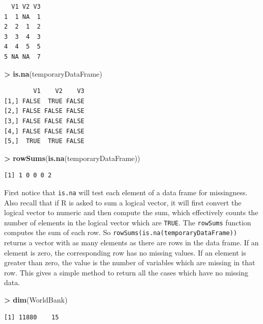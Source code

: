 \documentclass[]{krantz}
\makeatletter
\newenvironment{Shaded}{\begin{snugshade}}{\end{snugshade}}
\newcommand{\KeywordTok}[1]{\textcolor[rgb]{0.27,0.27,0.27}{\textbf{#1}}}
\newcommand{\NormalTok}[1]{#1}
\newcommand{\OperatorTok}[1]{\textcolor[rgb]{0.43,0.43,0.43}{\textbf{#1}}}
\newcommand{\StringTok}[1]{\textcolor[rgb]{0.5,0.5,0.5}{#1}}
\newenvironment{kframe}{%
\medskip{}
\setlength{\fboxsep}{.8em}
 \def\at@end@of@kframe{}%
 \ifinner\ifhmode%
  \def\at@end@of@kframe{\end{minipage}}%
  \begin{minipage}{\columnwidth}%
 \fi\fi%
 \def\FrameCommand##1{\hskip\@totalleftmargin \hskip-\fboxsep
 \colorbox{shadecolor}{##1}\hskip-\fboxsep
     \hskip-\linewidth \hskip-\@totalleftmargin \hskip\columnwidth}%
 \MakeFramed {\advance\hsize-\width
   \@totalleftmargin\z@ \linewidth\hsize
   \@setminipage}}%
 {\par\unskip\endMakeFramed%
 \at@end@of@kframe}
\renewenvironment{Shaded}{\begin{kframe}}{\end{kframe}}
\makeatother
\begin{document}
\begin{verbatim}
  V1 V2 V3
1  1 NA  1
2  2  1  2
3  3  4  3
4  4  5  5
5 NA NA  7
\end{verbatim}

\begin{Shaded}
\begin{Highlighting}[]
\OperatorTok{>}\StringTok{ }\KeywordTok{is.na}\NormalTok{(temporaryDataFrame)}
\end{Highlighting}
\end{Shaded}

\begin{verbatim}
        V1    V2    V3
[1,] FALSE  TRUE FALSE
[2,] FALSE FALSE FALSE
[3,] FALSE FALSE FALSE
[4,] FALSE FALSE FALSE
[5,]  TRUE  TRUE FALSE
\end{verbatim}

\begin{Shaded}
\begin{Highlighting}[]
\OperatorTok{>}\StringTok{ }\KeywordTok{rowSums}\NormalTok{(}\KeywordTok{is.na}\NormalTok{(temporaryDataFrame))}
\end{Highlighting}
\end{Shaded}

\begin{verbatim}
[1] 1 0 0 0 2
\end{verbatim}

First notice that \texttt{is.na} will test each element of a data frame for missingness. Also recall that if R is asked to sum a logical vector, it will first convert the logical vector to numeric and then compute the sum, which effectively counts the number of elements in the logical vector which are \texttt{TRUE}. The \texttt{rowSums} function computes the sum of each row. So \texttt{rowSums(is.na(temporaryDataFrame))} returns a vector with as many elements as there are rows in the data frame. If an element is zero, the corresponding row has no missing values. If an element is greater than zero, the value is the number of variables which are missing in that row. This gives a simple method to return all the cases which have no missing data.

\begin{Shaded}
\begin{Highlighting}[]
\OperatorTok{>}\StringTok{ }\KeywordTok{dim}\NormalTok{(WorldBank)}
\end{Highlighting}
\end{Shaded}

\begin{verbatim}
[1] 11880    15
\end{verbatim}
\end{document}
